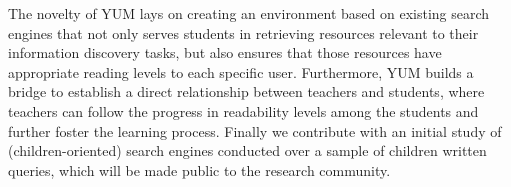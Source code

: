 \documentclass{sig-alternate-05-2015}
\begin{document}
The novelty of YUM lays on creating an environment based on existing search engines that not only serves students in retrieving resources relevant to their information discovery tasks, but also ensures that those resources have appropriate reading levels to each specific user. Furthermore, YUM builds a bridge to establish a direct relationship between teachers and students, where teachers can follow the progress in readability levels among the students and further foster the learning process. Finally we contribute with an initial study of (children-oriented) search engines conducted over a sample of children written queries, which will be made public to the research community.
\end{document}
